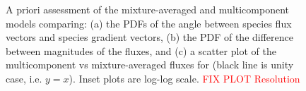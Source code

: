 \documentclass[preprint,review,12pt]{elsarticle}
\begin{document}
\begin{figure}[htb]
\begin{subfigure}{0.33\textwidth}
        \caption{}\label{A priori (b)}
    \end{subfigure}
    \begin{subfigure}{0.33\textwidth}
        \centering
        \caption{}\label{A priori (c)}
    \end{subfigure}
  \caption{A priori assessment of the mixture-averaged and multicomponent models comparing: (a) the PDFs of the angle between species flux vectors and species gradient vectors, (b) the PDF of the difference between magnitudes of the fluxes, and (c) a scatter plot of the multicomponent vs mixture-averaged fluxes for  (black line is unity case, i.e. $y=x$). Inset plots are log-log scale. \textcolor{red}{FIX PLOT Resolution}}\label{A priori}
\end{figure}
\end{document}
